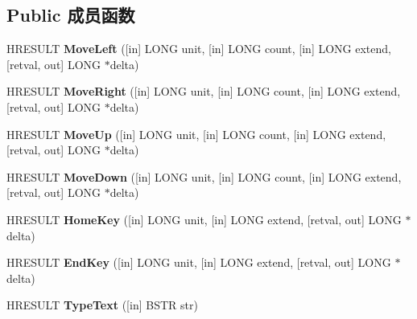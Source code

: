 \subsection*{Public 成员函数}
\begin{DoxyCompactItemize}
\item 
\mbox{\label{interfacetom_1_1_i_text_selection_a398d5c1ded49b5eaec656290fde1214c}} 
H\+R\+E\+S\+U\+LT {\bfseries Move\+Left} (\mbox{[}in\mbox{]} L\+O\+NG unit, \mbox{[}in\mbox{]} L\+O\+NG count, \mbox{[}in\mbox{]} L\+O\+NG extend, \mbox{[}retval, out\mbox{]} L\+O\+NG $\ast$delta)
\item 
\mbox{\label{interfacetom_1_1_i_text_selection_a833900d39dbdf88045e9fab9b8301b16}} 
H\+R\+E\+S\+U\+LT {\bfseries Move\+Right} (\mbox{[}in\mbox{]} L\+O\+NG unit, \mbox{[}in\mbox{]} L\+O\+NG count, \mbox{[}in\mbox{]} L\+O\+NG extend, \mbox{[}retval, out\mbox{]} L\+O\+NG $\ast$delta)
\item 
\mbox{\label{interfacetom_1_1_i_text_selection_a0011b113db5e5c1a429574c763ad2d32}} 
H\+R\+E\+S\+U\+LT {\bfseries Move\+Up} (\mbox{[}in\mbox{]} L\+O\+NG unit, \mbox{[}in\mbox{]} L\+O\+NG count, \mbox{[}in\mbox{]} L\+O\+NG extend, \mbox{[}retval, out\mbox{]} L\+O\+NG $\ast$delta)
\item 
\mbox{\label{interfacetom_1_1_i_text_selection_aea667ee9861c3ebfce6d9afbe8edf9bc}} 
H\+R\+E\+S\+U\+LT {\bfseries Move\+Down} (\mbox{[}in\mbox{]} L\+O\+NG unit, \mbox{[}in\mbox{]} L\+O\+NG count, \mbox{[}in\mbox{]} L\+O\+NG extend, \mbox{[}retval, out\mbox{]} L\+O\+NG $\ast$delta)
\item 
\mbox{\label{interfacetom_1_1_i_text_selection_a99c55192baf04b2f2bbb83a7c2b8a6de}} 
H\+R\+E\+S\+U\+LT {\bfseries Home\+Key} (\mbox{[}in\mbox{]} L\+O\+NG unit, \mbox{[}in\mbox{]} L\+O\+NG extend, \mbox{[}retval, out\mbox{]} L\+O\+NG $\ast$delta)
\item 
\mbox{\label{interfacetom_1_1_i_text_selection_a7afe634fd3a564b0970e1a29ba0b8b0b}} 
H\+R\+E\+S\+U\+LT {\bfseries End\+Key} (\mbox{[}in\mbox{]} L\+O\+NG unit, \mbox{[}in\mbox{]} L\+O\+NG extend, \mbox{[}retval, out\mbox{]} L\+O\+NG $\ast$delta)
\item 
\mbox{\label{interfacetom_1_1_i_text_selection_afb0115083d6b1e8cac60f2378d695447}} 
H\+R\+E\+S\+U\+LT {\bfseries Type\+Text} (\mbox{[}in\mbox{]} B\+S\+TR str)
\end{DoxyCompactItemize}
